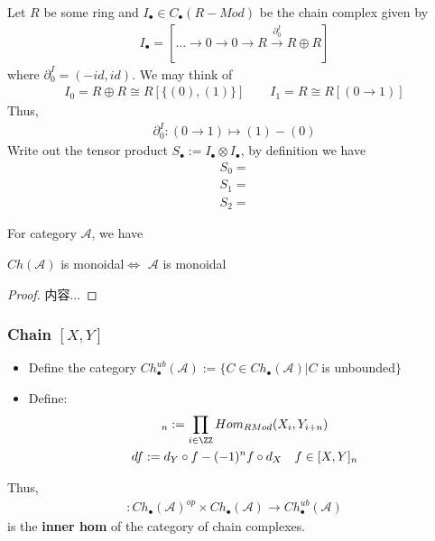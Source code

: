 \documentclass[Total.tex]{subfiles}
\begin{document}
				\begin{example}
					Let $R$ be some ring and $I_\bullet\in C_\bullet(R-Mod)$ be the chain complex given by
					\begin{gather*}
						I_\bullet=[\dots\rightarrow 0\rightarrow 0\rightarrow R\stackrel{\partial_0^I}{\rightarrow} R\oplus R]
					\end{gather*}
					where $\partial_0^I=(-id,id)$. We may think of 
					\begin{gather*}
						I_0=R\oplus R\cong R[\{(0),(1)\}]\qquad I_1=R\cong R[(0\rightarrow 1)]
					\end{gather*}
					Thus,
					\begin{gather*}
						\partial_0^I:(0\rightarrow 1)\mapsto (1)-(0)
					\end{gather*}
					Write out the tensor product $S_\bullet:=I_\bullet\otimes I_\bullet$, by definition we have
					\begin{gather*}
						S_0=\\
						S_1=\\
						S_2=
					\end{gather*}
				\end{example} 
				
				\begin{proposition}
					For category $\mathcal{A}$, we have
					\begin{center}
						$Ch(\mathcal{A})$ is monoidal$\Leftrightarrow$ $\mathcal{A}$ is monoidal
					\end{center}
				\end{proposition}
				\begin{proof}
					内容...
				\end{proof}
				\subsubsection{Chain $[X,Y]$}
				\begin{Def}
					\begin{itemize}
						\item 
						Define the category $Ch_\bullet^{ub}(\mathcal{A}):=\{C\in Ch_\bullet(\mathcal{A})|C$ is unbounded$\}$
						\item Define:
						\begin{gather*}
							[X,Y]_n:=\prod_{i\in \ZZ} Hom_{RMod}(X_i,Y_{i+n})\\
							df:=d_Y\circ f-(-1)^nf\circ d_X \quad f\in [X,Y]_n
						\end{gather*}
					\end{itemize}
				\end{Def}
				Thus,
				\begin{gather*}
					[-,-]:Ch_\bullet(\mathcal{A})^{op}\times Ch_\bullet(\mathcal{A})\rightarrow Ch_\bullet^{ub}(\mathcal{A})
				\end{gather*}
				is the \textbf{inner hom} of the category of chain complexes.
				
\end{document}
